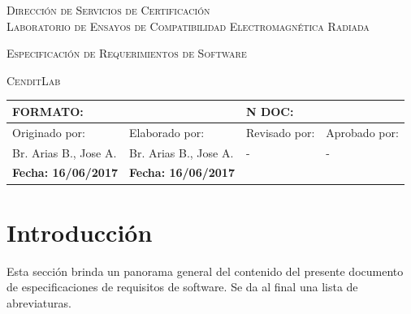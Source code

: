 \documentclass[paper=a4,oneside,fontsize=12pt]{article}
\newcommand{\AppName}{\textsc{CenditLab}\xspace}
\begin{document}
	
				
		\begin{center} 
			
			\begin{Large} 
				\textsc{Dirección de Servicios de Certificación}
				\\[5pt]
				\textsc{Laboratorio de Ensayos de Compatibilidad Electromagnética Radiada}
			\end{Large}
				
				\vspace{10cm}
			
			\begin{LARGE}			
				\textsc{Especificación de Requerimientos de Software}
			\end{LARGE}
		
			\vspace{8pt}
		
			\begin{Huge}
				\textsc{\AppName}
			\end{Huge}
		
			\begin{table}[!b]
				\begin{tabularx}{\linewidth}{|X|X|X|X|}	
					\hline				
					\multicolumn{2}{|l|}{\textbf{FORMATO}: } & \multicolumn{2}{|l|}{\textbf{N DOC:}} \\
					\hline
					Originado por:	& Elaborado por: & Revisado por: & Aprobado por: \\
					\hline
					Br. Arias B., Jose A. & Br. Arias B., Jose A. & - & - \\
					\hline
					\textbf{Fecha: 16/06/2017} & \textbf{Fecha: 16/06/2017} & & \\				
					\hline
				\end{tabularx}	
			\end{table}		
		
		\end{center}
		
	
	\clearpage

	\tableofcontents
	
	\clearpage
	
	\setlength{\parskip}{0.5em}
	
	\section{Introducción}
	Esta sección brinda un panorama general del contenido del presente documento de especificaciones de requisitos de software. Se da al final una lista de abreviaturas.
	
\end{document}
